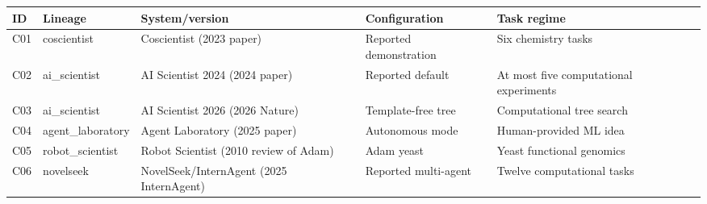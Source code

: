 \begin{tabular}{llllp{.25\linewidth}}
\toprule
ID & Lineage & System/version & Configuration & Task regime \\
\midrule
C01 & coscientist & Coscientist (2023 paper) & Reported demonstration & Six chemistry tasks \\
C02 & ai\_scientist & AI Scientist 2024 (2024 paper) & Reported default & At most five computational experiments \\
C03 & ai\_scientist & AI Scientist 2026 (2026 Nature) & Template-free tree & Computational tree search \\
C04 & agent\_laboratory & Agent Laboratory (2025 paper) & Autonomous mode & Human-provided ML idea \\
C05 & robot\_scientist & Robot Scientist (2010 review of Adam) & Adam yeast & Yeast functional genomics \\
C06 & novelseek & NovelSeek/InternAgent (2025 InternAgent) & Reported multi-agent & Twelve computational tasks \\
\bottomrule
\end{tabular}
